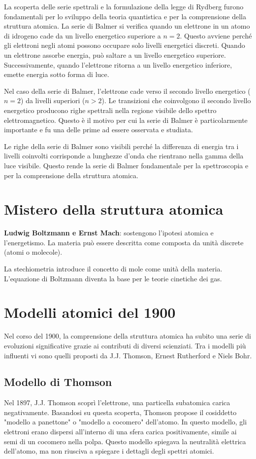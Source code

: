 La scoperta delle serie spettrali e la formulazione della legge di Rydberg furono fondamentali per lo sviluppo della teoria quantistica e per la comprensione della struttura atomica.
La serie di Balmer si verifica quando un elettrone in un atomo di idrogeno cade da un livello energetico superiore a \( n = 2 \). Questo avviene perché gli elettroni negli atomi possono occupare solo livelli energetici discreti. Quando un elettrone assorbe energia, può saltare a un livello energetico superiore. Successivamente, quando l'elettrone ritorna a un livello energetico inferiore, emette energia sotto forma di luce. 

Nel caso della serie di Balmer, l'elettrone cade verso il secondo livello energetico (\( n = 2 \)) da livelli superiori (\( n > 2 \)). Le transizioni che coinvolgono il secondo livello energetico producono righe spettrali nella regione visibile dello spettro elettromagnetico. Questo è il motivo per cui la serie di Balmer è particolarmente importante e fu una delle prime ad essere osservata e studiata.

Le righe della serie di Balmer sono visibili perché la differenza di energia tra i livelli coinvolti corrisponde a lunghezze d'onda che rientrano nella gamma della luce visibile. Questo rende la serie di Balmer fondamentale per la spettroscopia e per la comprensione della struttura atomica.

\section*{Mistero della struttura atomica}
\textbf{Ludwig Boltzmann e Ernst Mach}: sostengono l'ipotesi atomica e l'energetismo. La materia può essere descritta come composta da unità discrete (atomi o molecole).

La stechiometria introduce il concetto di mole come unità della materia. L'equazione di Boltzmann diventa la base per le teorie cinetiche dei gas.

\section*{Modelli atomici del 1900}

Nel corso del 1900, la comprensione della struttura atomica ha subito una serie di evoluzioni significative grazie ai contributi di diversi scienziati. Tra i modelli più influenti vi sono quelli proposti da J.J. Thomson, Ernest Rutherford e Niels Bohr.

\subsection*{Modello di Thomson}
Nel 1897, J.J. Thomson scoprì l'elettrone, una particella subatomica carica negativamente. Basandosi su questa scoperta, Thomson propose il cosiddetto "modello a panettone" o "modello a cocomero" dell'atomo. In questo modello, gli elettroni erano dispersi all'interno di una sfera carica positivamente, simile ai semi di un cocomero nella polpa. Questo modello spiegava la neutralità elettrica dell'atomo, ma non riusciva a spiegare i dettagli degli spettri atomici.

